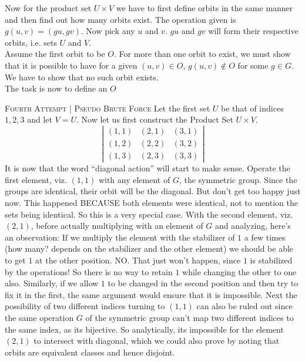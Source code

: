 \documentclass[12pt]{article}
\begin{document}
Now for the product set $U\times V$ we have to first define orbits in the same manner and then find out how many orbits exist. The operation given is $g(u,v)=(gu,gv)$. Now pick any $u$ and $v$. $gu$ and $gv$ will form their respective orbits, i.e. sets $U$ and $V$.\\
Assume the first orbit to be $O$. For more than one orbit to exist, we must show that it is possible to have for a given $(u,v) \in O$, $g(u,v) \notin O$ for some $g \in G$. We have to show that no such orbit exists.\\
The task is now to define an $O$
\par
\textsc {Fourth Attempt | Pseudo Brute Force } Let the first set $U$ be that of indices ${1,2,3}$ and let $V=U$. Now let us first construct the Product Set $U\times V$. 
\[ \left| \begin{array}{ccc}
(1,1) & (2,1) & (3,1) \\
(1,2) & (2,2) & (3,2) \\
(1,3) & (2,3) & (3,3) \end{array} \right|\]
It is now that the word ``diagonal action'' will start to make sense. Operate the first element, viz. $(1,1)$ with any element of $G$, the symmetric group. Since the groups are identical, their orbit will be the diagonal. But don't get too happy just now. This happened BECAUSE both elements were identical, not to mention the sets being identical. So this is a very special case. With the second element, viz. $(2,1)$, before actually multiplying with an element of $G$ and analyzing, here's an observation: If we multiply the element with the stabilizer of $1$ a few times (how many? depends on the stabilizer and the other element) we should be able to get $1$ at the other position. NO. That just won't happen, since $1$ is stabilized by the operations! So there is no way to retain $1$ while changing the other to one also. Similarly, if we allow $1$ to be changed in the second position and then try to fix it in the first, the same argument would ensure that it is impossible. Next the possibility of two different indices turning to $(1,1)$ can also be ruled out since the same operation $G$ of the symmetric group can't map two different indices to the same index, as its bijective. So analytically, its impossible for the element $(2,1)$ to intersect with diagonal, which we could also prove by noting that orbits are equivalent classes and hence disjoint.
\end{document}
